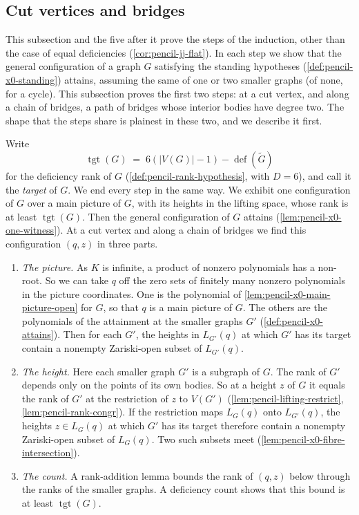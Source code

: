 \subsection{Cut vertices and bridges}
\label{sec:main-component-cut}

This subsection and the five after it prove the steps of the induction,
other than the case of equal deficiencies (\cref{cor:pencil-jj-flat}).
In each step we show that the general configuration of a graph $G$
satisfying the standing hypotheses (\cref{def:pencil-x0-standing})
attains, assuming the same of one or two smaller graphs (of none, for a
cycle). This subsection proves the first two steps: at a cut vertex, and
along a chain of bridges, a path of bridges whose interior bodies have
degree two. The shape that the steps share is plainest in these two,
and we describe it first.

Write
\[
  \operatorname{tgt}(G) \;=\; 6(|V(G)| - 1) - \operatorname{def}(\tilde G)
\]
for the deficiency rank of $G$ (\cref{def:pencil-rank-hypothesis}, with
$D = 6$), and call it the \emph{target} of $G$. We end every step in the
same way. We exhibit one configuration of $G$ over a main picture of
$G$, with its heights in the lifting space, whose rank is at least
$\operatorname{tgt}(G)$. Then the general configuration of $G$ attains
(\cref{lem:pencil-x0-one-witness}). At a cut vertex and along a chain of
bridges we find this configuration $(q, z)$ in three parts.
\begin{enumerate}
  \item \emph{The picture.} As $K$ is infinite, a product of nonzero
    polynomials has a non-root. So we can take $q$ off the zero sets of
    finitely many nonzero polynomials in the picture coordinates. One is
    the polynomial of \cref{lem:pencil-x0-main-picture-open} for $G$, so
    that $q$ is a main picture of $G$. The others are the polynomials of
    the attainment at the smaller graphs $G'$
    (\cref{def:pencil-x0-attains}). Then for each $G'$, the heights in
    $L_{G'}(q)$ at which $G'$ has its target contain a nonempty
    Zariski-open subset of $L_{G'}(q)$.
  \item \emph{The height.} Here each smaller graph $G'$ is a subgraph of
    $G$. The rank of $G'$ depends only on the points of its own bodies.
    So at a height $z$ of $G$ it equals the rank of $G'$ at the
    restriction of $z$ to $V(G')$ (\cref{lem:pencil-lifting-restrict},
    \cref{lem:pencil-rank-congr}). If the restriction maps $L_G(q)$ onto
    $L_{G'}(q)$, the heights $z \in L_G(q)$ at which $G'$ has its target
    therefore contain a nonempty Zariski-open subset of $L_G(q)$. Two
    such subsets meet (\cref{lem:pencil-x0-fibre-intersection}).
  \item \emph{The count.} A rank-addition lemma bounds the rank of
    $(q, z)$ below through the ranks of the smaller graphs. A deficiency
    count shows that this bound is at least $\operatorname{tgt}(G)$.
\end{enumerate}

